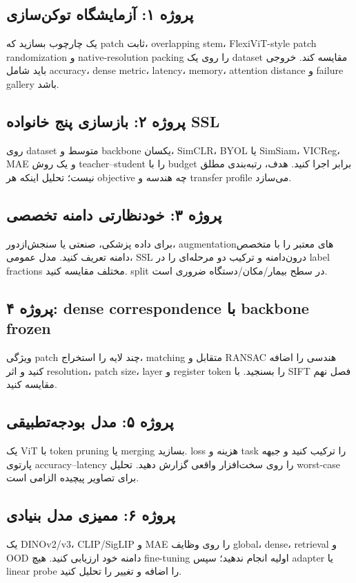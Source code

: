 \documentclass[12pt,openany,oneside]{book}
\begin{document}
\subsection{پروژه ۱: آزمایشگاه توکن‌سازی}
یک چارچوب بسازید که patch ثابت، overlapping stem، FlexiViT-style patch randomization و native-resolution packing را روی یک dataset مقایسه کند. خروجی باید شامل accuracy، dense metric، latency، memory، attention distance و failure gallery باشد.

\subsection{پروژه ۲: بازسازی پنج خانواده SSL}
روی dataset متوسط و backbone یکسان، SimCLR، BYOL یا SimSiam، VICReg، MAE و یک روش teacher--student را با budget برابر اجرا کنید. هدف، رتبه‌بندی مطلق نیست؛ تحلیل اینکه هر objective چه هندسه و transfer profile می‌سازد.

\subsection{پروژه ۳: خودنظارتی دامنه تخصصی}
برای داده پزشکی، صنعتی یا سنجش‌ازدور، augmentationهای معتبر را با متخصص دامنه تعریف کنید. مدل عمومی، SSL درون‌دامنه و ترکیب دو مرحله‌ای را در label fractions مختلف مقایسه کنید. split در سطح بیمار/مکان/دستگاه ضروری است.

\subsection{پروژه ۴: dense correspondence با backbone frozen}
ویژگی patch چند لایه را استخراج، matching متقابل و RANSAC هندسی را اضافه کنید و اثر resolution، patch size، layer و register token را بسنجید. با SIFT فصل نهم مقایسه کنید.

\subsection{پروژه ۵: مدل بودجه‌تطبیقی}
یک ViT با token pruning یا merging بسازید. loss هزینه و task را ترکیب کنید و جبهه پارتوی accuracy--latency را روی سخت‌افزار واقعی گزارش دهید. تحلیل worst-case برای تصاویر پیچیده الزامی است.

\subsection{پروژه ۶: ممیزی مدل بنیادی}
یک DINOv2/v3، CLIP/SigLIP و MAE را روی وظایف global، dense، retrieval و OOD دامنه خود ارزیابی کنید. هیچ fine-tuning اولیه انجام ندهید؛ سپس adapter یا linear probe را اضافه و تغییر را تحلیل کنید.
\end{document}
